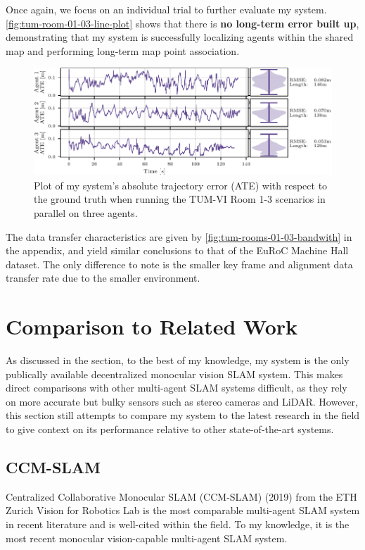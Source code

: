 Once again, we focus on an individual trial to further evaluate my system. \autoref{fig:tum-room-01-03-line-plot} shows that there is \textbf{no long-term error built up}, demonstrating that my system is successfully localizing agents within the shared map and performing long-term map point association.

\begin{figure}[h]
    \centering
    \includegraphics[width=0.85\linewidth]{figures/apr11_tum_room_trajectory_a_line_plot.pdf}

    \caption{Plot of my system's absolute trajectory error (ATE) with respect to the ground truth when running the TUM-VI Room 1-3 scenarios in parallel on three agents.}
    \label{fig:tum-room-01-03-line-plot}
\end{figure}

The data transfer characteristics are given by \autoref{fig:tum-rooms-01-03-bandwith} in the appendix, and yield similar conclusions to that of the EuRoC Machine Hall dataset. The only difference to note is the smaller key frame and alignment data transfer rate due to the smaller environment.

\section{Comparison to Related Work}
\label{sec:comparison-to-related-work}

As discussed in the  section, to the best of my knowledge, my system is the only publically available decentralized monocular vision SLAM system. This makes direct comparisons with other multi-agent SLAM systems difficult, as they rely on more accurate but bulky sensors such as stereo cameras and LiDAR. However, this section still attempts to compare my system to the latest research in the field to give context on its performance relative to other state-of-the-art systems.

\subsection{CCM-SLAM}
\label{sec:ccm-slam}
Centralized Collaborative Monocular SLAM (CCM-SLAM) (2019) from the ETH Zurich Vision for Robotics Lab \autocite{schmuck2019ccm} is the most comparable multi-agent SLAM system in recent literature and is well-cited within the field. To my knowledge, it is the most recent monocular vision-capable multi-agent SLAM system.


